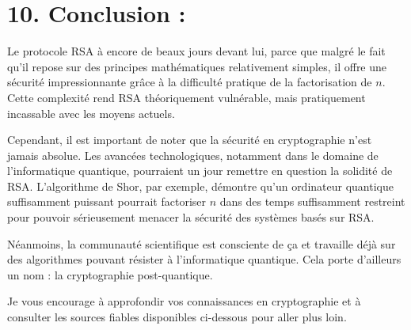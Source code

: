 \documentclass[
  paper=a4,
  ,captions=tableheading
]{scrartcl}
\begin{document}
\section{10. Conclusion :}\label{conclusion}

Le protocole RSA à encore de beaux jours devant lui, parce que malgré le
fait qu'il repose sur des principes mathématiques relativement simples,
il offre une sécurité impressionnante grâce à la difficulté pratique de
la factorisation de \(n\). Cette complexité rend RSA théoriquement
vulnérable, mais pratiquement incassable avec les moyens actuels.

Cependant, il est important de noter que la sécurité en cryptographie
n'est jamais absolue. Les avancées technologiques, notamment dans le
domaine de l'informatique quantique, pourraient un jour remettre en
question la solidité de RSA. L'algorithme de Shor, par exemple, démontre
qu'un ordinateur quantique suffisamment puissant pourrait factoriser
\(n\) dans des temps suffisamment restreint pour pouvoir sérieusement
menacer la sécurité des systèmes basés sur RSA.

Néanmoins, la communauté scientifique est consciente de ça et travaille
déjà sur des algorithmes pouvant résister à l'informatique quantique.
Cela porte d'ailleurs un nom : la cryptographie post-quantique.

Je vous encourage à approfondir vos connaissances en cryptographie et à
consulter les sources fiables disponibles ci-dessous pour aller plus
loin.
\end{document}
